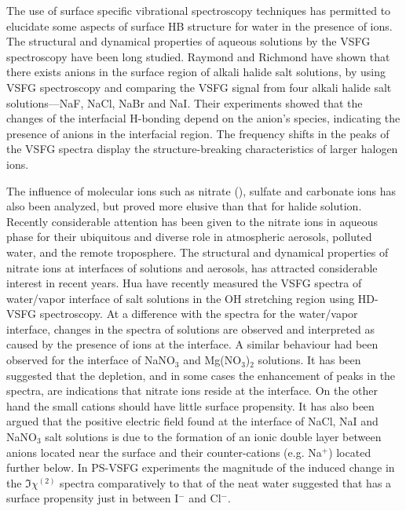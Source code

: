 The use of surface specific vibrational spectroscopy techniques has 
permitted to elucidate some aspects of surface HB structure for water in 
the presence of ions\cite{Jubb2012,AGL05}. 
The structural and dynamical properties of aqueous solutions by the VSFG spectroscopy have been long studied. 
Raymond and Richmond\cite{Raymond2004} have shown that there exists anions in the surface region of alkali halide salt solutions, 
by using VSFG spectroscopy and comparing the VSFG signal from four alkali halide salt solutions---NaF, NaCl, NaBr 
and NaI. Their experiments showed that the changes of the interfacial H-bonding depend on the anion's species, 
indicating the presence of anions in the interfacial region. The frequency shifts in the peaks of the VSFG spectra display 
the structure-breaking characteristics of larger halogen ions.

The influence of molecular ions such as nitrate (\nitrate), sulfate­ and 
carbonate ions­ has also been analyzed, but proved more elusive than that for halide solution\cite{SG05,Salvador2003}.
Recently considerable attention has been given to the nitrate ions in aqueous phase 
for their ubiquitous and diverse role in atmospheric aerosols, polluted water, 
and the remote troposphere\cite{Pitts2000,XuM2009,Jubb2012,Cochran2017,Yadav2017}.
The structural and dynamical properties of 
nitrate ions at interfaces of solutions\cite{Banerjee2016,Yadav2017b} and aerosols\cite{Robinson2020}, has attracted considerable interest in recent years.
Hua \etal\cite{HuaWei2014} have recently measured the VSFG spectra of water/vapor interface of \LiN salt solutions in the OH stretching region
using HD-VSFG spectroscopy\cite{HuaWei2011,HuaWei2011b,ChenXiangKe2010}. 
At a difference with the spectra for the water/vapor interface, changes in the spectra of 
\LiN solutions are observed and interpreted as caused by the presence of ions at the interface.  
A similar behaviour had been observed for the interface of NaNO$_3$ and 
Mg(NO$_3$)$_2$ solutions\cite{Jubb2012,HuaWei2014}. 
It has been suggested that the depletion, and in some cases 
the enhancement of peaks in the spectra, are indications that nitrate 
ions reside at the interface. On the other hand the small 
cations should have little surface propensity. 
It has also been argued that the positive electric field found at the interface of NaCl, NaI and 
NaNO$_3$ salt solutions is due to the formation of an ionic double layer 
between anions located near the surface and their counter-cations (e.g.
Na$^+$) located further below. In PS-VSFG experiments the 
magnitude of the induced change in the $\Im\chi^{(2)}$ spectra comparatively
to that of the neat water suggested that \nitrate has a surface propensity 
just in between I$^-$ and Cl$^-$\cite{Verreault2013,Verreault2009}. 

